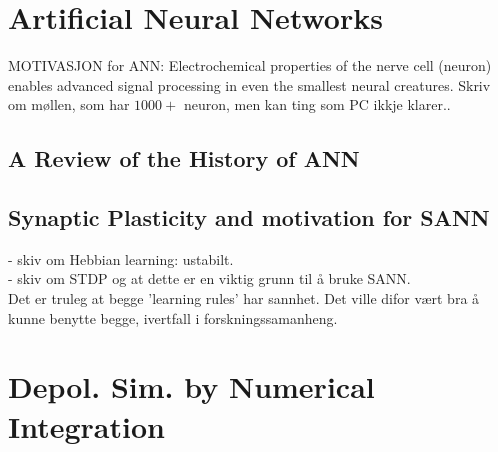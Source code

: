
\section{Artificial Neural Networks}

	MOTIVASJON for ANN: Electrochemical properties of the nerve cell (neuron) enables advanced signal processing in even the smallest neural creatures. Skriv om møllen, som har $1000+$ neuron, men kan ting som PC ikkje klarer..

	\subsection{A Review of the History of ANN}
	\subsection{Synaptic Plasticity and motivation for SANN}
		- skiv om Hebbian learning: ustabilt. \\
		- skiv om STDP og at dette er en viktig grunn til å bruke SANN. \\
		Det er truleg at begge 'learning rules' har sannhet. Det ville difor vært bra å kunne benytte begge, ivertfall i forskningssamanheng.

\section{Depol. Sim. by Numerical Integration}
		
